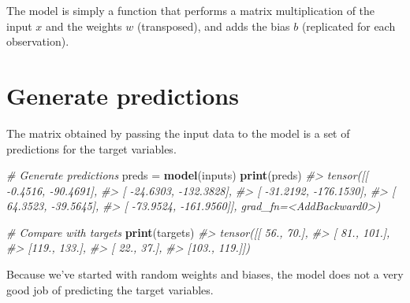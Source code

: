 \documentclass[]{book}
\newenvironment{Shaded}{\begin{snugshade}}{\end{snugshade}}
\newcommand{\CommentTok}[1]{\textcolor[rgb]{0.56,0.35,0.01}{\textit{#1}}}
\newcommand{\ControlFlowTok}[1]{\textcolor[rgb]{0.13,0.29,0.53}{\textbf{#1}}}
\newcommand{\KeywordTok}[1]{\textcolor[rgb]{0.13,0.29,0.53}{\textbf{#1}}}
\newcommand{\NormalTok}[1]{#1}
\newcommand{\OperatorTok}[1]{\textcolor[rgb]{0.81,0.36,0.00}{\textbf{#1}}}
\newcommand{\StringTok}[1]{\textcolor[rgb]{0.31,0.60,0.02}{#1}}
\begin{document}
The model is simply a function that performs a matrix multiplication of the input \(x\) and the weights \(w\) (transposed), and adds the bias \(b\) (replicated for each observation).

\begin{Shaded}
\end{Shaded}

\hypertarget{generate-predictions}{%
\section{Generate predictions}\label{generate-predictions}}

The matrix obtained by passing the input data to the model is a set of predictions for the target variables.

\begin{Shaded}
\begin{Highlighting}[]
\CommentTok{# Generate predictions}
\NormalTok{preds =}\StringTok{ }\KeywordTok{model}\NormalTok{(inputs)}
\KeywordTok{print}\NormalTok{(preds)}
\CommentTok{#> tensor([[  -0.4516,  -90.4691],}
\CommentTok{#>         [ -24.6303, -132.3828],}
\CommentTok{#>         [ -31.2192, -176.1530],}
\CommentTok{#>         [  64.3523,  -39.5645],}
\CommentTok{#>         [ -73.9524, -161.9560]], grad_fn=<AddBackward0>)}
\end{Highlighting}
\end{Shaded}

\begin{Shaded}
\begin{Highlighting}[]
\CommentTok{# Compare with targets}
\KeywordTok{print}\NormalTok{(targets)}
\CommentTok{#> tensor([[ 56.,  70.],}
\CommentTok{#>         [ 81., 101.],}
\CommentTok{#>         [119., 133.],}
\CommentTok{#>         [ 22.,  37.],}
\CommentTok{#>         [103., 119.]])}
\end{Highlighting}
\end{Shaded}

Because we've started with random weights and biases, the model does not a very good job of predicting the target variables.
\end{document}
